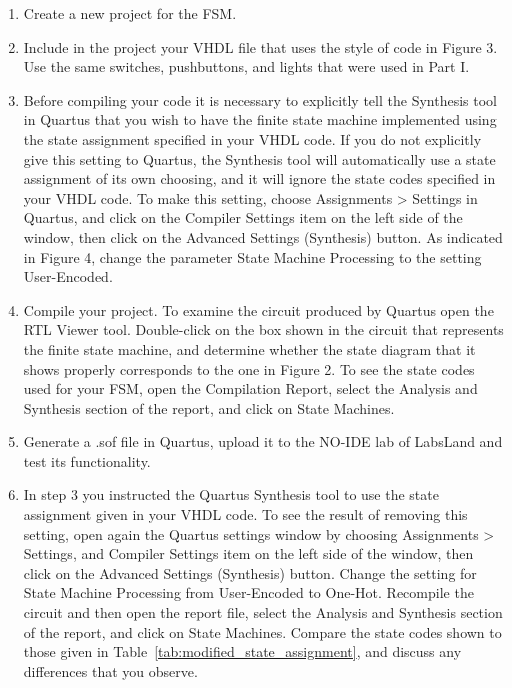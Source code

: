 \documentclass[epsfig,10pt,fullpage]{article}
\begin{document}
\begin{enumerate}
\item Create a new project for the FSM.

\item Include in the project your VHDL file that uses the style of code in Figure 3.
Use the same switches, pushbuttons, and lights that were used in Part I.

\item Before compiling your code it is necessary to explicitly tell the Synthesis tool in
Quartus that you wish to have the finite state machine implemented using the state
assignment specified in your VHDL code. If you do not explicitly give this
setting to Quartus, the Synthesis tool will automatically use a state assignment of
its own choosing, and it will ignore the state codes specified in your VHDL code. To
make this setting, choose {\sf Assignments > Settings} in Quartus, and click on the
{\sf Compiler Settings} item on the left side of the window, then click on 
the {\sf Advanced Settings (Synthesis)} button.  As indicated in Figure 4, change the 
parameter {\sf State Machine Processing} to the setting {\sf User-Encoded}.

\item Compile your project. To examine the circuit produced by Quartus open 
the RTL Viewer tool. Double-click
on the box shown in the circuit that represents the finite state machine, and determine
whether the state diagram that it shows properly corresponds to the one in Figure 2.
To see the state codes used for your FSM, open the Compilation Report, select the {\sf Analysis
and Synthesis} section of the report, and click on {\sf State Machines}.

\item Generate a .sof file in Quartus, upload it to the NO-IDE lab of LabsLand and test its functionality.

\item In step 3 you instructed the Quartus Synthesis tool to use the state
assignment given in your VHDL code. To see the result of removing this setting, open
again the Quartus settings window by choosing {\sf Assignments > Settings}, and 
{\sf Compiler Settings} item on the left side of the window, then click on 
the {\sf Advanced Settings (Synthesis)} button. Change the setting for  
{\sf State Machine Processing} from {\sf User-Encoded} to {\sf One-Hot}. Recompile the
circuit and then open the report file, select the {\sf Analysis
and Synthesis} section of the report, and click on {\sf State Machines}.
Compare the state codes shown to those given in Table~\ref{tab:modified_state_assignment}, and
discuss any differences that you observe.

\end{enumerate}
\end{document}
